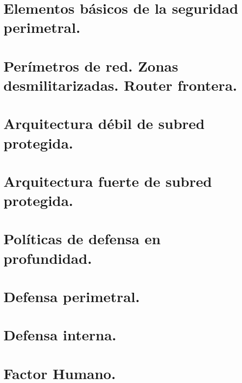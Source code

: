 \documentclass[letterpaper,10pt,spanish]{sphinxmanual}
\begin{document}
\section{Elementos básicos de la seguridad perimetral.}
\label{\detokenize{tema_acceso_remoto/tema_acceso_remoto:elementos-basicos-de-la-seguridad-perimetral}}

\section{Perímetros de red. Zonas desmilitarizadas. Router frontera.}
\label{\detokenize{tema_acceso_remoto/tema_acceso_remoto:perimetros-de-red-zonas-desmilitarizadas-router-frontera}}

\section{Arquitectura débil de subred protegida.}
\label{\detokenize{tema_acceso_remoto/tema_acceso_remoto:arquitectura-debil-de-subred-protegida}}

\section{Arquitectura fuerte de subred protegida.}
\label{\detokenize{tema_acceso_remoto/tema_acceso_remoto:arquitectura-fuerte-de-subred-protegida}}

\section{Políticas de defensa en profundidad.}
\label{\detokenize{tema_acceso_remoto/tema_acceso_remoto:politicas-de-defensa-en-profundidad}}

\section{Defensa perimetral.}
\label{\detokenize{tema_acceso_remoto/tema_acceso_remoto:defensa-perimetral}}

\section{Defensa interna.}
\label{\detokenize{tema_acceso_remoto/tema_acceso_remoto:defensa-interna}}

\section{Factor Humano.}
\label{\detokenize{tema_acceso_remoto/tema_acceso_remoto:factor-humano}}
\end{document}
